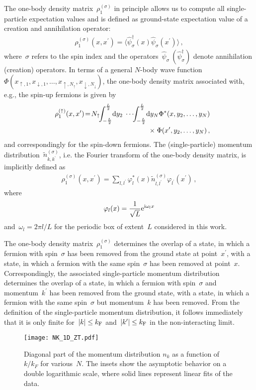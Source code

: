 \documentclass[pra,aps,groupedaddress,floatfix,twocolumn,superscriptaddress,showpacs,nofootinbib]{revtex4-1}
\newcommand{\nn}{\nonumber }
\newcommand{\be}{\begin{eqnarray}}
\newcommand{\ee}{\end{eqnarray}}
\newcommand{\kf}{k_\textnormal{F}}
\begin{document}
{The one-body density matrix~$\rho_1^{(\sigma)}$ in principle allows {us} to compute all
single-particle expectation values and
is defined as ground-state expectation value of
a creation and annihilation operator:
%
\be
\rho_1^{(\sigma)}(x,x^{\prime})=\langle \hat{\psi}^{\dagger}_{\sigma}(x) \hat{\psi}_{\sigma}(x^{\prime})\rangle\,,
\ee
%
where~$\sigma$ refers to the spin index and
the operators~{$\hat{\psi}_{\sigma}\ (\hat{\psi}_{\sigma}^{\dagger})$} denote annihilation (creation) operators.
In terms of a general $N$-body wave
function~$\Phi(x_{\uparrow,1},x_{\downarrow,1},\dots,x_{\uparrow,N_{\uparrow}},x_{\downarrow,N_{\downarrow}})$,
the one-body density matrix associated with, e.g., the spin-up fermions is given by
%
\be
&& \rho_1^{(\uparrow)}(x,x^{\prime})\!=\!
N_{\uparrow}\!\!\int_{-\frac{L}{2}}^{\frac{L}{2}}\!{\rm d}y_{2}\;\cdots\!\!\int_{-\frac{L}{2}}^{\frac{L}{2}}\! {\rm d}y_{N}\Phi^{\ast}(x,y_2,\dots,y_N)\nn\\
&& \qquad\qquad\qquad\qquad\qquad\qquad\times\; \Phi(x^{\prime},y_2,\dots,y_N)\,,
\ee
%
and correspondingly for the spin-down fermions. The (single-particle) momentum distribution~$\tilde{n}_{k,k^{\prime}}^{(\sigma)}$,
i.e. the Fourier transform of
the one-body density matrix, is implicitly defined as
%
\be
\rho_1^{(\sigma)}(x,x^{\prime})\!=\!
\sum_{l,l^{\prime}} \varphi_l^{\ast}(x)\tilde{n}_{l,l^{\prime}}^{(\sigma)}\varphi_{l^{\prime}}(x^{\prime})\,,
\label{eq:momdistdef}
\ee
%
where
%
\be
\varphi_l(x)=\frac{1}{\sqrt{L}}{\rm e}^{{\rm i}\omega_l x}
\ee
%
and~$\omega_l = 2\pi l/L$ for the periodic box of extent~$L$ considered in this
work.

The one-body density matrix~$\rho_1^{(\sigma)}$ determines the overlap of a state,
in which a fermion with spin~$\sigma$ has been removed
from the ground state at point~$x^{\prime}$, with a state, in which a fermion with the same spin~$\sigma$ has
been removed at point~$x$.
Correspondingly, the associated single-particle momentum distribution
determines the overlap of a state,
in which a fermion with spin~$\sigma$ and momentum~$k^{\prime}$ has been removed
from the ground state, with a state, in which a fermion with the same spin~$\sigma$ but momentum~$k$ has
been removed. From the definition of the single-particle momentum distribution,
it follows immediately that it
is only finite for~$|k|\leq \kf$ and~$|k^{\prime}|\leq \kf$ in the non-interacting limit.
%
\begin{figure}[t]
 \texttt{[image: NK\_1D\_ZT.pdf]}
 \caption{Diagonal part of the momentum distribution $n_{k}$
 as a function of $k/k^{}_F$ for various~$N$. The insets show the
 asymptotic behavior on a double logarithmic scale,
 where solid lines represent linear fits of the data.}
 \label{Fig:MomDist}
\end{figure}
%
%

}
\end{document}
